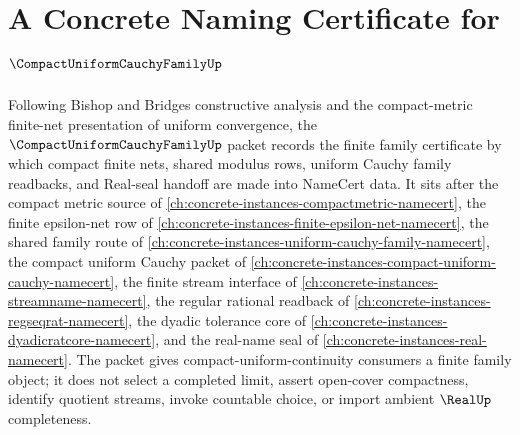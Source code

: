 \chapter{A Concrete Naming Certificate for $\CompactUniformCauchyFamilyUp$}
\label{ch:concrete-instances-compact-uniform-cauchy-family-namecert}

Following Bishop and Bridges constructive analysis and the compact-metric finite-net presentation of uniform convergence, the $\CompactUniformCauchyFamilyUp$ packet records the finite family certificate by which compact finite nets, shared modulus rows, uniform Cauchy family readbacks, and Real-seal handoff are made into NameCert data. It sits after the compact metric source of \autoref{ch:concrete-instances-compactmetric-namecert}, the finite epsilon-net row of \autoref{ch:concrete-instances-finite-epsilon-net-namecert}, the shared family route of \autoref{ch:concrete-instances-uniform-cauchy-family-namecert}, the compact uniform Cauchy packet of \autoref{ch:concrete-instances-compact-uniform-cauchy-namecert}, the finite stream interface of \autoref{ch:concrete-instances-streamname-namecert}, the regular rational readback of \autoref{ch:concrete-instances-regseqrat-namecert}, the dyadic tolerance core of \autoref{ch:concrete-instances-dyadicratcore-namecert}, and the real-name seal of \autoref{ch:concrete-instances-real-namecert}. The packet gives compact-uniform-continuity consumers a finite family object; it does not select a completed limit, assert open-cover compactness, identify quotient streams, invoke countable choice, or import ambient $\RealUp$ completeness.


